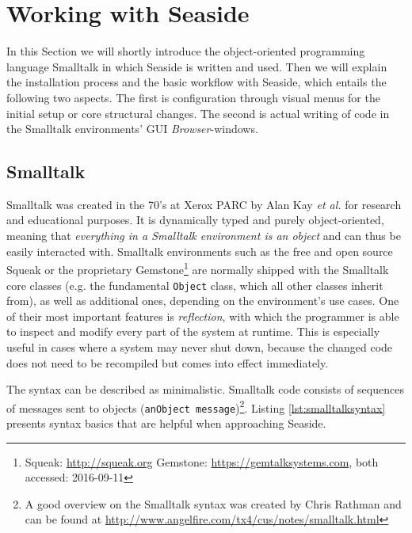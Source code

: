 \documentclass[a4paper,12pt,pagesize,headsepline,oribibl,titlepage]{scrartcl}
\begin{document}
\section{Working with Seaside}
\label{sec:workflow}

In this Section we will shortly introduce the object-oriented programming language Smalltalk in which Seaside is written and used. Then we will explain the installation process and the basic workflow with Seaside, which entails the following two aspects. The first is configuration through visual menus for the initial setup or core structural changes. The second is actual writing of code in the Smalltalk environments' GUI \emph{Browser}-windows\cite{perscheid2008introduction}.


\subsection{Smalltalk}

Smalltalk was created in the 70's at Xerox PARC by Alan Kay \emph{et al.} for research and educational purposes. It is dynamically typed and purely object-oriented, meaning that \emph{everything in a Smalltalk environment is an object} and can thus be easily interacted with. Smalltalk environments such as the free and open source Squeak or the proprietary Gemstone\footnote{Squeak: \url{http://squeak.org} Gemstone: \url{https://gemtalksystems.com}, both accessed: 2016-09-11} are normally shipped with the Smalltalk core classes (e.g. the fundamental \texttt{Object} class, which all other classes inherit from), as well as additional ones, depending on the environment's use cases. One of their most important features is \emph{reflection}, with which the programmer is able to inspect and modify every part of the system at runtime. This is especially useful in cases where a system may never shut down, because the changed code does not need to be recompiled but comes into effect immediately. 

The syntax can be described as minimalistic. Smalltalk code consists of sequences of messages sent to objects (\texttt{anObject message})\footnote{A good overview on the Smalltalk syntax was created by Chris Rathman and can be found at \url{http://www.angelfire.com/tx4/cus/notes/smalltalk.html}}. Listing \ref{lst:smalltalksyntax} presents syntax basics that are helpful when approaching Seaside.  
\end{document}
